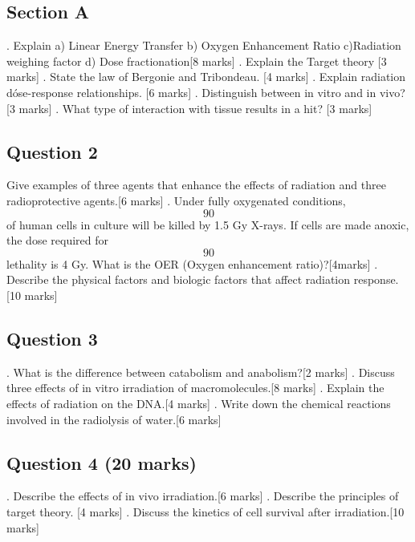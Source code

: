 \documentclass{assignment}
\date{\today}                                   %
\begin{document}
\begin{problem}

\section{Section A}
. Explain a) Linear Energy Transfer b) Oxygen Enhancement Ratio c)Radiation weighing factor d) Dose fractionation[8 marks]
. Explain the Target theory [3 marks]
. State the law of Bergonie and Tribondeau. [4 marks]
. Explain radiation dóse-response relationships. [6 marks]
. Distinguish between in vitro and in vivo? [3 marks]
. What type of interaction with tissue results in a hit? [3 marks]

\subsection{Question 2}
 Give examples of three agents that enhance the effects of radiation and three radioprotective agents.[6 marks]
. Under fully oxygenated conditions, \begin{equation}90%
\end{equation} of human cells in culture will be killed by 1.5 Gy X-rays. If
cells are made anoxic, the dose required for \begin{equation}
    90%
\end{equation} lethality is 4 Gy. What is the OER (Oxygen enhancement ratio)?[4marks]
. Describe the physical factors and biologic factors that affect radiation response.[10 marks]
\subsection*{Question 3}
.  What is the difference between catabolism and anabolism?[2 marks]
. Discuss three effects of in vitro irradiation of macromolecules.[8 marks]
. Explain the effects of radiation on the DNA.[4 marks]
. Write down the chemical reactions involved in the radiolysis of water.[6 marks]
\subsection*{Question 4 (20 marks)} 

. Describe the effects of in vivo irradiation.[6 marks]
. Describe the principles of target theory. [4 marks]
. Discuss the kinetics of cell survival after irradiation.[10 marks]

\end{problem}
\end{document}
